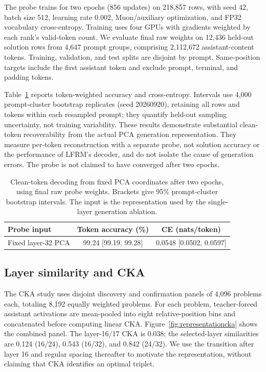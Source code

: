 \documentclass{article}
\begin{document}
The probe trains for two epochs (856 updates) on 218,857 rows, with seed 42, batch size 512, learning rate 0.002, Muon/auxiliary optimization, and FP32 vocabulary cross-entropy. Training uses four GPUs with gradients weighted by each rank's valid-token count. We evaluate final raw weights on 12,436 held-out solution rows from 4,647 prompt groups, comprising 2,112,672 assistant-content tokens. Training, validation, and test splits are disjoint by prompt. Same-position targets include the first assistant token and exclude prompt, terminal, and padding tokens.

Table~\ref{tab:pcadecoding} reports token-weighted accuracy and cross-entropy. Intervals use 4,000 prompt-cluster bootstrap replicates (seed 20260920), retaining all rows and tokens within each resampled prompt; they quantify held-out sampling uncertainty, not training variability. These results demonstrate substantial clean-token recoverability from the actual PCA generation representation. They measure per-token reconstruction with a separate probe, not solution accuracy or the performance of LFRM's decoder, and do not isolate the cause of generation errors. The probe is not claimed to have converged after two epochs.

\begin{table}[htbp]
\centering\small
\caption{Clean-token decoding from fixed PCA coordinates after two epochs, using final raw probe weights. Brackets give 95\% prompt-cluster bootstrap intervals. The input is the representation used by the single-layer generation ablation.}
\label{tab:pcadecoding}
\begin{tabular}{@{}lcc@{}}
\toprule
Probe input & Token accuracy (\%) & CE (nats/token) \\
\midrule
Fixed layer-32 PCA & 99.24 [99.19, 99.28] & 0.0548 [0.0502, 0.0597] \\
\bottomrule
\end{tabular}
\end{table}

\subsection{Layer similarity and CKA}
\label{app:representationcka}
The CKA study uses disjoint discovery and confirmation panels of 4,096 problems each, totaling 8,192 equally weighted problems. For each problem, teacher-forced assistant activations are mean-pooled into eight relative-position bins and concatenated before computing linear CKA. Figure~\ref{fig:representationcka} shows the combined panel. The layer-16/17 CKA is 0.038; the selected-layer similarities are 0.124 (16/24), 0.543 (16/32), and 0.842 (24/32). We use the transition after layer 16 and regular spacing thereafter to motivate the representation, without claiming that CKA identifies an optimal triplet.
\end{document}
